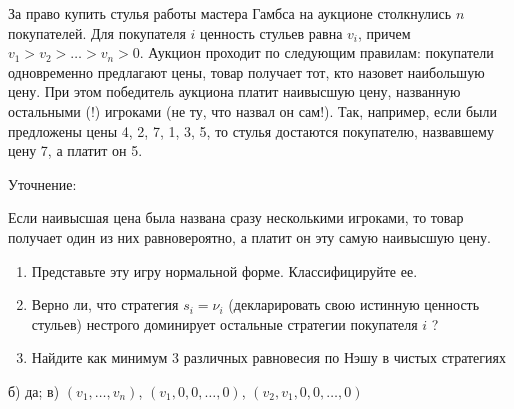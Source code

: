 \begin{problem}
За право купить стулья работы мастера Гамбса на аукционе столкнулись  $n$ покупателей. Для покупателя  $i$ ценность стульев равна  $v_{i} $, причем  $v_{1} >v_{2} >\ldots >v_{n} >0$. Аукцион проходит по следующим правилам: покупатели одновременно предлагают цены, товар получает тот, кто назовет наибольшую цену. При этом победитель аукциона платит наивысшую цену, названную остальными (!) игроками (не ту, что назвал он сам!). Так, например, если были предложены цены 4, 2, 7, 1, 3, 5, то стулья достаются покупателю, назвавшему цену 7, а платит он 5.\par
Уточнение: \par
Если наивысшая цена была названа сразу несколькими игроками, то товар получает один из них равновероятно, а платит он эту самую наивысшую цену. \par
\begin{enumerate}
\item Представьте эту игру нормальной форме. Классифицируйте ее.\par
\item Верно ли, что стратегия  $s_{i} =\nu _{i} $  (декларировать свою истинную ценность стульев)  нестрого доминирует остальные стратегии покупателя $i$ ?\par
\item  Найдите как минимум 3 различных равновесия по Нэшу в чистых стратегиях
\end{enumerate}


\begin{sol}
б) да; в) $(v_{1},\ldots, v_{n})$, $(v_{1},0,0,\ldots,0)$, $(v_{2},v_{1},0,0,\ldots,0)$
\end{sol}
\end{problem}




